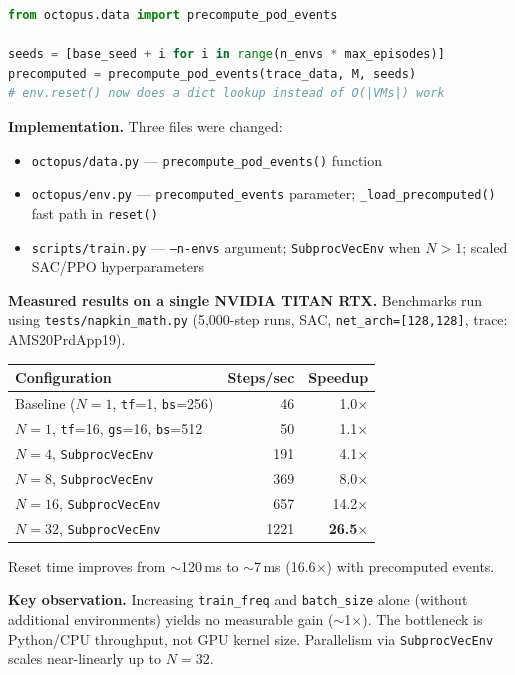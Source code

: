 \documentclass[11pt]{article}
\begin{document}
\begin{lstlisting}[language=Python, caption=Precomputed event cache]
from octopus.data import precompute_pod_events

seeds = [base_seed + i for i in range(n_envs * max_episodes)]
precomputed = precompute_pod_events(trace_data, M, seeds)
# env.reset() now does a dict lookup instead of O(|VMs|) work
\end{lstlisting}

\textbf{Implementation.}
Three files were changed:
\begin{itemize}
    \item \texttt{octopus/data.py} — \texttt{precompute\_pod\_events()} function
    \item \texttt{octopus/env.py} — \texttt{precomputed\_events} parameter; \texttt{\_load\_precomputed()} fast path in \texttt{reset()}
    \item \texttt{scripts/train.py} — \texttt{--n-envs} argument; \texttt{SubprocVecEnv} when $N > 1$; scaled SAC/PPO hyperparameters
\end{itemize}

\textbf{Measured results on a single NVIDIA TITAN RTX.}
Benchmarks run using \texttt{tests/napkin\_math.py} (5,000-step runs, SAC,
\texttt{net\_arch=[128,128]}, trace: AMS20PrdApp19).

\begin{center}
\begin{tabular}{lrr}
\hline
\textbf{Configuration} & \textbf{Steps/sec} & \textbf{Speedup} \\
\hline
Baseline ($N=1$, \texttt{tf}=1, \texttt{bs}=256) & 46  & 1.0$\times$ \\
$N=1$, \texttt{tf}=16, \texttt{gs}=16, \texttt{bs}=512  & 50  & 1.1$\times$ \\
$N=4$,  \texttt{SubprocVecEnv}              & 191 & 4.1$\times$ \\
$N=8$,  \texttt{SubprocVecEnv}              & 369 & 8.0$\times$ \\
$N=16$, \texttt{SubprocVecEnv}              & 657 & 14.2$\times$ \\
$N=32$, \texttt{SubprocVecEnv}              & 1221 & \textbf{26.5$\times$} \\
\hline
\end{tabular}
\end{center}

Reset time improves from $\sim$120\,ms to $\sim$7\,ms (16.6$\times$) with
precomputed events.

\textbf{Key observation.}
Increasing \texttt{train\_freq} and \texttt{batch\_size} alone (without
additional environments) yields no measurable gain ($\sim$1$\times$).
The bottleneck is Python/CPU throughput, not GPU kernel size.
Parallelism via \texttt{SubprocVecEnv} scales near-linearly up to $N=32$.
\end{document}

